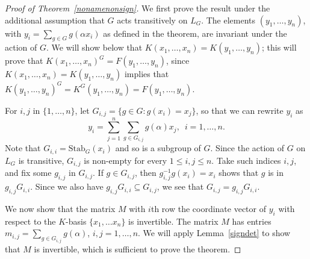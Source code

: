 \documentclass[12pt]{article}
\theoremstyle{plain}
\newtheorem{theorem}{Theorem}
\begin{document}
\begin{proof}[Proof of Theorem~\ref{nonamenonsign}]
  We first prove the result under the additional assumption that $G$
  acts transitively on $L_G$.  The elements $(y_1,\dots,y_n)$, with
  $y_i = \sum_{g \in G} g(\alpha x_i)$ as defined in the theorem, are
  invariant under the action of $G$. We will show below that
  $K(x_1,\dots,x_n)=K(y_1,\dots,y_n)$; this will prove that
  $K(x_1,\dots,x_n)^G=F(y_1,\dots,y_n)$, since
  $K(x_1,\dots,x_n)=K(y_1,\dots,y_n)$ implies that
  $K(y_1,\dots,y_n)^G=K^G(y_1,\dots,y_n)=F(y_1,\dots,y_n)$.

  For $i,j$ in $\{1,\dots,n\}$, let $G_{i,j}= \lbrace g \in G: g(x_i)
  = x_j \rbrace$, so that we can rewrite $y_i$ as $$y_i = \sum^n_{j
    =1}\sum_{g \in G_{i,j}}g(\alpha)x_j, \,\,\, i = 1, \ldots, n.$$
  Note that $G_{i,i}=\mathrm{Stab}_G(x_i)$ and so is a subgroup of $G$. Since the action of $G$ on $L_G$ is 
  transitive, $G_{i,j}$ is
  non-empty for every $1 \leq i,j \leq n$. Take such indices $i,j$,
  and fix some $g_{i,j}$ in $G_{i,j}$. If $g \in G_{i,j}$, then
  $g^{-1}_{i,j}g(x_i) = x_i$ shows that $g$ is in
  $g_{i,j}G_{i,i}$. Since we also have
  $g_{i,j}G_{i,i} \subseteq G_{i,j}$, we see that
  $G_{i,j} = g_{i,j}G_{i,i}$.



  We now show that the matrix $M$ with $i$th row the coordinate vector
  of $y_i$ with respect to the $K$-basis $\lbrace x_1, \ldots x_n
  \rbrace$ is invertible. The matrix $M$ has entries $m_{i,j} =
  \sum_{g \in G_{i,j}}g(\alpha)$, $i,j = 1, \ldots, n$. We will apply
  Lemma~\ref{signdet} to show that $M$ is invertible, which is sufficient to 
  prove the theorem.


\end{proof}
\end{document}
